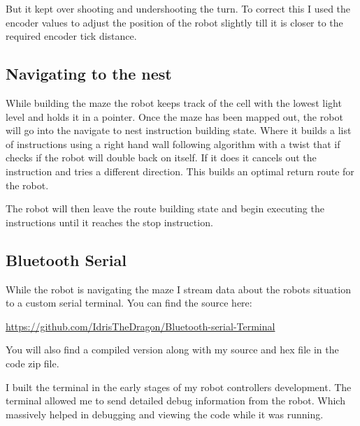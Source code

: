 \documentclass[11pt,a4paper,titlepage]{article}
\begin{document}
                But it kept over shooting and undershooting the turn. 
                To correct this I used the encoder values to adjust the position of the robot slightly till it is closer to the required encoder tick distance. 
        \subsection{Navigating to the nest}
            While building the maze the robot keeps track of the cell with the lowest light level and holds it in a pointer. 
            Once the maze has been mapped out, the robot will go into the navigate to nest instruction building state. 
            Where it builds a list of instructions using a right hand wall following algorithm with a twist that if checks if the robot will double back on itself.
            If it does it cancels out the instruction and tries a different direction.
            This builds an optimal return route for the robot.
            
            The robot will then leave the route building state and begin executing the instructions until it reaches the stop instruction.
        \subsection{Bluetooth Serial}
            While the robot is navigating the maze I stream data about the robots situation to a custom serial terminal. 
            You can find the source here:

                \url{https://github.com/IdrisTheDragon/Bluetooth-serial-Terminal}

            You will also find a compiled version along with my source and hex file in the code zip file.

            I built the terminal in the early stages of my robot controllers development.
            The terminal allowed me to send detailed debug information from the robot. 
            Which massively helped in debugging and viewing the code while it was running.
\end{document}
